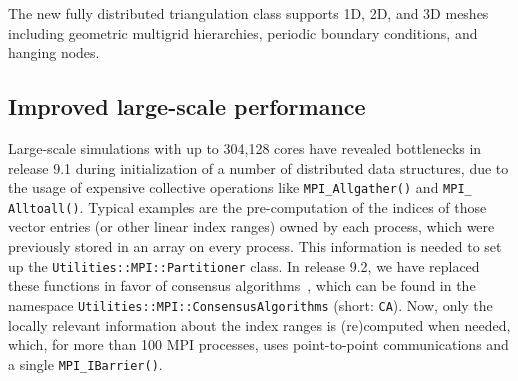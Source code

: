 \documentclass{ansarticle-preprint}
\begin{document}
The new fully distributed triangulation class supports 1D, 2D, and 3D meshes
including geometric multigrid hierarchies, periodic boundary conditions, and
hanging nodes.




\subsection{Improved large-scale performance}
\label{subsec:performance}

Large-scale simulations with up to 304,128 cores have revealed bottlenecks in release
9.1 during initialization of a number of distributed data structures, due to the usage of expensive collective operations
like \texttt{MPI\_Allgather()} and \texttt{MPI\_\allowbreak
  Alltoall()}. Typical examples are the
pre-computation of the indices of those vector entries (or
other linear index ranges) owned by
each process, which were previously stored in  an array on every process.
This information is needed to set up
the  \texttt{Utilities::MPI::Par\-ti\-ti\-oner} class.
In release 9.2, we have replaced these functions in favor of
consensus algorithms~\cite{hoefler2010scalable}, which can be
found in the namespace \texttt{Utilities::\allowbreak MPI::\allowbreak ConsensusAlgorithms} (short: \texttt{CA}).
Now, only the locally relevant information about the index ranges is
(re)computed when needed, which, for more than 100 MPI processes, uses
point-to-point communications and a single \texttt{MPI\_IBarrier()}.

\end{document}
